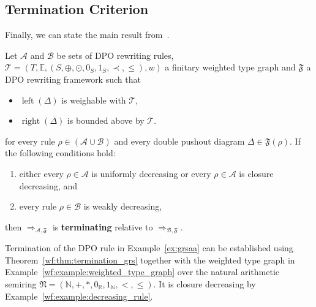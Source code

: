 \subsection{Termination Criterion}
\label{wf:sec:termination}
Finally, we can state the main result from~\cite{endrullis2024generalized_icgt}.
\begin{theorem} 
    \label{wf:thm:termination_grs}
    Let $\mathcal{A}$ and $\mathcal{B}$ be sets of DPO rewriting rules, $\mathcal{T} = (T,\mathbb{E}, (S, \oplus, \odot, 0_S, 1_S, \prec, \leq), w)$ a finitary weighted type graph and $\mathfrak{F}$ a DPO rewriting framework such that

        \begin{itemize} 
            \item \(\operatorname{left}(\Delta)\) is weighable with \(\mathcal{T}\),
            \item \(\operatorname{right}(\Delta)\) is bounded above by \(\mathcal{T}\). 
        \end{itemize}
    for every rule $\rho \in (\mathcal{A }\cup \mathcal{B })$ and every double pushout diagram  
        $\Delta \in \mathfrak{F}(\rho)$. If the following conditions hold:
    \begin{enumerate}
        \item either every $\rho \in \mathcal{A}$ is uniformly decreasing or every $\rho \in \mathcal{A}$ is closure decreasing, and
        \item every rule $\rho \in \mathcal{B}$ is weakly decreasing,
    \end{enumerate}
    then $\Rightarrow_{\mathcal{A},\mathfrak{F}}$ is \textbf{terminating} relative to $\Rightarrow_{\mathcal{B},\mathfrak{F}}$.
\end{theorem} 
\begin{example} 
    \label{wf:example:termination}
    Termination of the DPO rule in Example~\ref{ex:grsaa} can be established using Theorem~\ref{wf:thm:termination_grs} together with the weighted type graph in Example~\ref{wf:example:weighted_type_graph} over the natural arithmetic semiring $\mathfrak{N} = (\mathbb{N},+,*,0_\mathbb{R},1_\mathbb{N},<,\leq)$. It is closure decreasing by Example~\ref{wf:example:decreasing_rule}.
\end{example}
